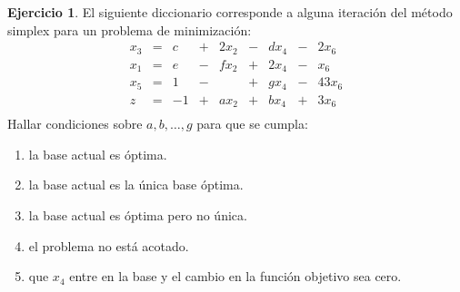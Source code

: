 \documentclass[12pt]{article}
\theoremstyle{definition}
\newtheorem{ejer}{Ejercicio}
\newcommand{\bej}{\begin{ejer}}
\newcommand{\fej}{\end{ejer}}
\begin{document}
\bej
El siguiente diccionario corresponde a alguna iteración del método simplex para un problema de minimización:
\[
\begin{array}{rrrrrrrrr}
    x_3 & = & c & + & 2x_2 & - & dx_4 & - & 2x_6  \\
    x_1 & = & e & - & fx_2 & + & 2x_4 & - & x_6  \\
    x_5 & = & 1 & - &  & + & gx_4 & - & 43x_6  \\\hline
    z & = & -1 & + & ax_2 & + & bx_4 & + & 3x_6  \\
\end{array}
\]
Hallar condiciones sobre $a,b,\dots,g$ para que se cumpla:
\begin{enumerate}[label=\alph*)]
    \item la base actual es óptima.
    \item la base actual es la única base óptima.
    \item la base actual es óptima pero no única.
    \item el problema no está acotado.
    \item que $x_4$ entre en la base y el cambio en la función objetivo sea cero.
\end{enumerate}
\fej
\end{document}
